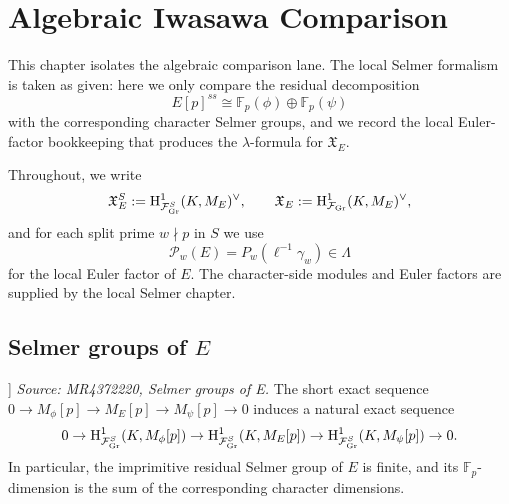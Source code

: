 \providecommand{\Fcal}{\mathcal{F}}
\providecommand{\rH}{\mathrm{H}}

\chapter{Algebraic Iwasawa Comparison}
\label{chap:algebraic-comparison}


This chapter isolates the algebraic comparison lane. The local Selmer formalism is taken as given: here we only compare the residual decomposition
\[
E[p]^{ss}\cong \mathbb F_p(\phi)\oplus \mathbb F_p(\psi)
\]
with the corresponding character Selmer groups, and we record the local Euler-factor bookkeeping that produces the \(\lambda\)-formula for \(\mathfrak X_E\).

Throughout, we write
\[
\mathfrak X_E^S:=\rH^1_{\Fcal_{\rm Gr}^S}(K,M_E)^\vee,
\qquad
\mathfrak X_E:=\rH^1_{\Fcal_{\rm Gr}}(K,M_E)^\vee,
\]
and for each split prime \(w\nmid p\) in \(S\) we use
\[
\mathcal P_w(E)=P_w(\ell^{-1}\gamma_w)\in\Lambda
\]
for the local Euler factor of \(E\). The character-side modules and Euler factors are supplied by the local Selmer chapter.

\section{Selmer groups of \texorpdfstring{\(E\)}{E}}

\begin{proposition}[Residual comparison for \(E[p]\)]
  \label{prop:modp-E}
  \textit{Source: MR4372220, Selmer groups of E.}
  The short exact sequence \(0 \to M_\phi[p] \to M_E[p] \to M_\psi[p] \to 0\) induces a natural exact sequence
  \[
  0 \to \rH^1_{\Fcal_{\rm Gr}^S}(K,M_\phi[p]) \to \rH^1_{\Fcal_{\rm Gr}^S}(K,M_E[p]) \to
  \rH^1_{\Fcal_{\rm Gr}^S}(K,M_\psi[p]) \to 0.
  \]
  In particular, the imprimitive residual Selmer group of \(E\) is finite, and its \(\mathbb F_p\)-dimension is the sum of the corresponding character dimensions.
\end{proposition}

